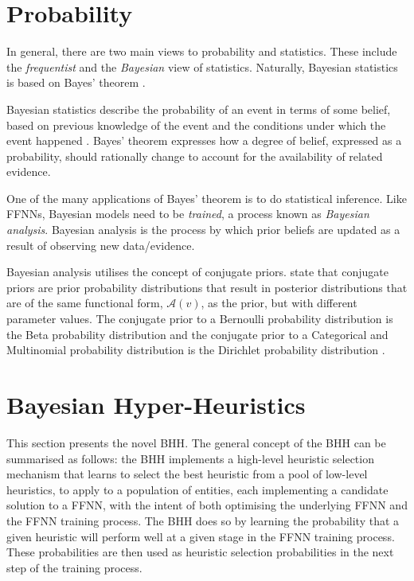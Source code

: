 \documentclass[preprint,review,12pt]{elsarticle}
\begin{document}
\section{Probability}
\label{sec:probability}

In general, there are two main views to probability and statistics. These include the \textit{frequentist} and the \textit{Bayesian} view of statistics. Naturally, Bayesian statistics is based on Bayes' theorem \citep{ref:bayes:1763}.

Bayesian statistics describe the probability of an event in terms of some belief, based on previous knowledge of the event and the conditions under which the event happened \citep{ref:hackenberger:2019}. Bayes' theorem expresses how a degree of belief, expressed as a probability, should rationally change to account for the availability of related evidence.

One of the many applications of Bayes' theorem is to do statistical inference. Like \acp{FFNN}, Bayesian models need to be \textit{trained}, a process known as \textit{Bayesian analysis}. Bayesian analysis is the process by which prior beliefs are updated as a result of observing new data/evidence.

Bayesian analysis utilises the concept of conjugate priors. \citet{ref:wackerly:2014} state that conjugate priors are prior probability distributions that result in posterior distributions that are of the same functional form, $\mathcal{A}(v)$, as the prior, but with different parameter values. The conjugate prior to a Bernoulli probability distribution is the Beta probability distribution and the conjugate prior to a Categorical and Multinomial probability distribution is the Dirichlet probability distribution \citep{ref:wackerly:2014}.


\section{Bayesian Hyper-Heuristics}
\label{sec:bhh}

This section presents the novel \acs{BHH}. The general concept of the \acs{BHH} can be summarised as follows: the \acs{BHH} implements a high-level heuristic selection mechanism that learns to select the best heuristic from a pool of low-level heuristics, to apply to a population of entities, each implementing a candidate solution to a \acs{FFNN}, with the intent of both optimising the underlying \acs{FFNN} and the \acs{FFNN} training process. The \acs{BHH} does so by learning the probability that a given heuristic will perform well at a given stage in the \acs{FFNN} training process. These probabilities are then used as heuristic selection probabilities in the next step of the training process.
\end{document}
